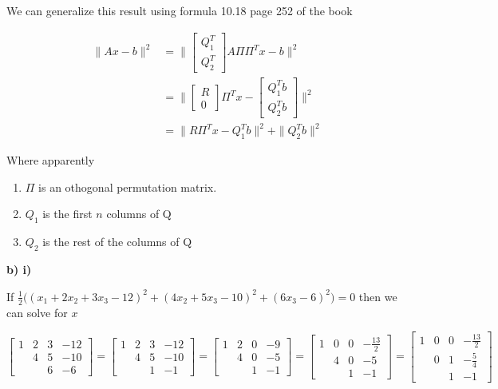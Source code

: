 We can generalize this result using formula 10.18 page 252 of the book

\begin{align*}
	\|Ax -b\|^2 &= \|\begin{bmatrix}
		Q_1^T \\ Q_2^T
	\end{bmatrix} A \Pi \Pi^Tx-b \|^2 \\
	&= \|\begin{bmatrix}
		R \\ 0
	\end{bmatrix} \Pi^Tx-\begin{bmatrix}
		Q_1^Tb \\ Q_2^Tb
	\end{bmatrix} \|^2 \\
	&= \| R\Pi^Tx-Q_1^Tb\|^2 + \|Q_2^Tb\|^2
\end{align*}

Where apparently 
\begin{enumerate}
\item $\Pi$ is an othogonal permutation matrix.
\item $Q_1$ is the first $n$ columns of Q
\item $Q_2$ is the rest of the columns of Q
\end{enumerate}

\textbf{b) i)}

\answer

If $\frac{1}{2} \Bigg( (x_1 + 2x_2 + 3x_3 - 12)^2 + (4x_2 + 5x_3 -10)^2 + (6x_3 - 6)^2  \Bigg) = 0$ then we can solve for $x$

\[
\begin{bmatrix}
	1 & 2 & 3 & -12 \\
	  & 4 & 5 & -10 \\
	  &   & 6 & -6
\end{bmatrix} =
\begin{bmatrix}
	1 & 2 & 3 & -12 \\
	  & 4 & 5 & -10 \\
	  &   & 1 & -1
\end{bmatrix} =
\begin{bmatrix}
	1 & 2 & 0 & -9 \\
	  & 4 & 0 & -5 \\
	  &   & 1 & -1
\end{bmatrix} =
\begin{bmatrix}
	1 & 0 & 0 & -\frac{13}{2} \\
	  & 4 & 0 & -5            \\
	  &   & 1 & -1
\end{bmatrix} =
\begin{bmatrix}
	1 & 0 & 0 & -\frac{13}{2} \\
	  & 0 & 1 & -\frac{5}{4}  \\
	  &   & 1 & -1
\end{bmatrix}
\]

